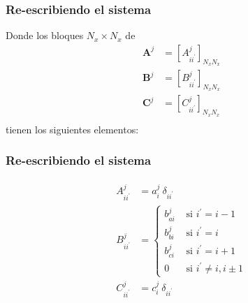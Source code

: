 \begin{frame}
\frametitle{Re-escribiendo el sistema}
Donde los bloques $N_{x} \times N_{x}$ de
\begin{align*}
\mathbf{A}^{j} &= [A_{ii^{\prime}}^{j}]_{N_{x} N_{x}} \\[0.5em]
\mathbf{B}^{j} &= [B_{ii^{\prime}}^{j}]_{N_{x} N_{x}} \\[0.5em]
\mathbf{C}^{j} &= [C_{ii^{\prime}}^{j}]_{N_{x} N_{x}} \\
\end{align*}   
tienen los siguientes elementos:
\end{frame}
\begin{frame}
\frametitle{Re-escribiendo el sistema}
\begin{align}
\begin{aligned}
A_{ii^{\prime}}^{j} &= a_{i}^{j} \: \delta_{ii^{\prime}} \\[0.5em]
B_{ii^{\prime}}^{j} &= \begin{cases}
b_{ai}^{j} & \mbox{ si } i^{\prime} = i-1 \\[0.25em]
b_{bi}^{j} & \mbox{ si } i^{\prime} = i \\[0.25em]
b_{ci}^{j} & \mbox{ si } i^{\prime} = i+1 \\[0.25em]
0 & \mbox{ si } i^{\prime} \neq i, i \pm 1 \end{cases} \\[0.5em]
C_{ii^{\prime}}^{j} &= c_{i}^{j} \: \delta_{ii^{\prime}}
\end{aligned}
\label{eq:ecuacion:13_16}
\end{align}
\end{frame}
